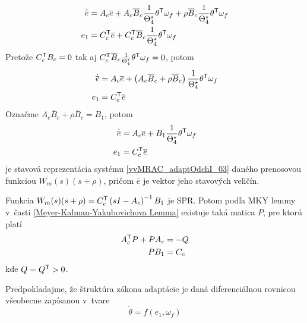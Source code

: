 ﻿\documentclass[a4paper, 10pt, ]{article}
\begin{document}
\begin{subequations}
	\begin{align}
		\dot{\overline{e}}
		&=
		A_c
		\overline{e}
		+
		A_c
		\overline{B}_c
		\frac{1}{\Theta_4^\star}
		\theta^{\mathsf{T}}
		\omega_f
		+
		\rho
		\overline{B}_c
		\frac{1}{\Theta_4^\star}
		\theta^{\mathsf{T}}
		\omega_f
		\\
		e_1
		&=
		C_c^{\mathsf{T}}
		\overline{e}
		+
		C_c^{\mathsf{T}}
		\overline{B}_c
		\frac{1}{\Theta_4^\star}
		\theta^{\mathsf{T}}
		\omega_f
	\end{align}
\end{subequations}
Pretože $C_c^{\mathsf{T}} {B}_c = 0$ tak aj $C_c^{\mathsf{T}} \overline{B}_c \frac{1}{\Theta_4^\star} \theta^{\mathsf{T}} \omega_f = 0 $, potom
\begin{subequations}
	\begin{align}
		\dot{\overline{e}}
		&=
		A_c
		\overline{e}
		+
		\left(
			A_c
			\overline{B}_c
			+
			\rho
			\overline{B}_c
		\right)
		\frac{1}{\Theta_4^\star}
		\theta^{\mathsf{T}}
		\omega_f
		\\
		e_1
		&=
		C_c^{\mathsf{T}}
		\overline{e}
	\end{align}
\end{subequations}
Označme $A_c \overline{B}_c + \rho \overline{B}_c = B_1 $, potom
\begin{subequations} \label{vvMRAC_adaptOdchISS2}
	\begin{align}
		\dot{\overline{e}}
		&=
		A_c
		\overline{e}
		+
		B_1
		\frac{1}{\Theta_4^\star}
		\theta^{\mathsf{T}}
		\omega_f
		\\
		e_1
		&=
		C_c^{\mathsf{T}}
		\overline{e}
	\end{align}
\end{subequations}
je stavová reprezentácia systému \eqref{vvMRAC_adaptOdchI_03} daného prenosovou funkciou $W_m(s)(s + \rho)$, pričom $\overline{e}$ je vektor jeho stavových veličín.

Funkcia $W_m(s)(s + \rho) = C_c^{\mathsf{T}} \left( s I - A_c \right)^{-1} B_1$ je SPR. Potom podľa MKY lemmy v~časti \ref{Meyer-Kalman-Yakubovichova Lemma} existuje taká matica $P$, pre ktorú platí
\begin{subequations} \label{vvMRAC_dosledkyMKYlemmyn2}
	\begin{align}
		A_c^{\mathsf{T}} P  +  P {A_c} &=  - Q \\
		P  B_1 &= {C_c}
	\end{align}
\end{subequations}
kde $Q = Q^{\mathsf{T}} > 0$.

Predpokladajme, že štruktúra zákona adaptácie je daná diferenciálnou rovnicou všeobecne zapísanou v~tvare
\begin{equation}
	\dot\theta = f(e_1, \omega_f)
\end{equation}
\end{document}
